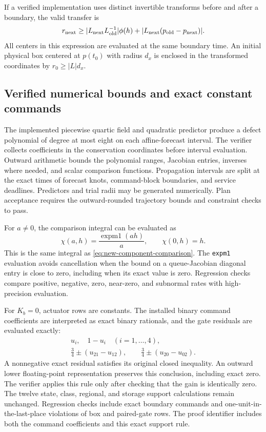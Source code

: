 \documentclass[preprint,12pt]{elsarticle}
\begin{document}
If a verified implementation
uses distinct invertible transforms before and after a boundary, the valid
transfer is
\begin{equation}
 r_{\rm next}\ge
 |L_{\rm next}L_{\rm old}^{-1}|\phi(h)
 +|L_{\rm next}(p_{\rm old}-p_{\rm next})|.
 \label{eq:new-coordinate-transfer}
\end{equation}
All centers in this expression are evaluated at the same boundary time.
An initial physical box centered at $p(t_0)$ with radius $d_x$ is enclosed
in the transformed coordinates by $r_0\ge|L|d_x$.

\subsection{Verified numerical bounds and exact constant commands}

The implemented piecewise quartic field and quadratic predictor produce a
defect polynomial of degree at most eight on each affine-forecast interval.
The verifier collects coefficients in the conservation coordinates before
interval evaluation. Outward arithmetic bounds the polynomial ranges,
Jacobian entries, inverses where needed, and scalar comparison functions.
Propagation intervals are split at the exact times of forecast knots,
command-block boundaries, and service deadlines. Predictors and trial radii
may be generated numerically. Plan acceptance requires the outward-rounded
trajectory bounds and constraint checks to pass.

For $a\ne0$, the comparison integral can be evaluated as
\begin{equation}
 \chi(a,h)=\frac{\operatorname{expm1}(ah)}{a},
 \qquad \chi(0,h)=h.
 \label{eq:new-stable-comparison}
\end{equation}
This is the same integral as \eqref{eq:new-component-comparison}.
The \texttt{expm1} evaluation avoids cancellation when the bound on a
queue-Jacobian diagonal entry is close to zero, including when its exact
value is zero. Regression checks compare positive, negative, zero,
near-zero, and subnormal rates with high-precision evaluation.

For $K_b=0$, actuator rows are constants. The installed binary command
coefficients are interpreted as exact binary rationals, and the gate
residuals are evaluated exactly:
\begin{equation}
 \begin{gathered}
 u_i,\quad 1-u_i\quad(i=1,\ldots,4),\\
 \tfrac34\pm(u_{21}-u_{12}),\qquad
 \tfrac34\pm(u_{20}-u_{02}).
 \end{gathered}
 \label{eq:new-exact-actuator-residuals}
\end{equation}
A nonnegative exact residual satisfies its original closed inequality.
An outward lower floating-point representation preserves this conclusion,
including exact zero. The verifier applies this rule only after checking
that the gain is identically zero. The twelve state, class, regional, and
storage support calculations remain unchanged. Regression checks
include exact boundary commands and one-unit-in-the-last-place violations
of box and paired-gate rows. The proof identifier includes both the command
coefficients and this exact support rule.
\end{document}
